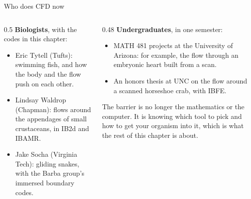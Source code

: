 \documentclass[aspectratio=169,11pt]{beamer}
\begin{document}
\begin{frame}{Who does CFD now}
\begin{columns}[T,onlytextwidth]
\begin{column}{0.5\textwidth}
\textbf{Biologists}, with the codes in this chapter:
\begin{itemize}
  \item Eric Tytell (Tufts): swimming fish, and how the body and the flow push on each other.
  \item Lindsay Waldrop (Chapman): flows around the appendages of small crustaceans, in IB2d and IBAMR.
  \item Jake Socha (Virginia Tech): gliding snakes, with the Barba group's immersed boundary codes.
\end{itemize}
\end{column}
\begin{column}{0.48\textwidth}
\textbf{Undergraduates}, in one semester:
\begin{itemize}
  \item MATH 481 projects at the University of Arizona: for example, the flow through an embryonic heart built from a scan.
  \item An honors thesis at UNC on the flow around a scanned horseshoe crab, with IBFE.
\end{itemize}
\vspace{2mm}
\begin{punchbox}
\small The barrier is no longer the mathematics or the computer. It is knowing which tool to pick and how to get your organism into it, which is what the rest of this chapter is about.
\end{punchbox}
\end{column}
\end{columns}
\end{frame}
\end{document}
